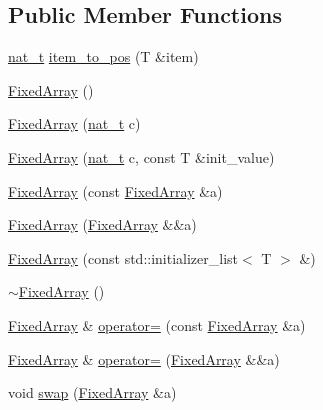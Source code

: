 \subsection*{Public Member Functions}
\begin{DoxyCompactItemize}
\item 
\hyperlink{namespace_designar_aa72662848b9f4815e7bf31a7cf3e33d1}{nat\+\_\+t} \hyperlink{class_designar_1_1_fixed_array_af1c7e826a704015eab8f3accac7ead7d}{item\+\_\+to\+\_\+pos} (T \&item)
\item 
\hyperlink{class_designar_1_1_fixed_array_a493a48e7c23b6b882a96c5451d10248a}{Fixed\+Array} ()
\item 
\hyperlink{class_designar_1_1_fixed_array_ac3bed73485d717ddc1fc412d3e7fea58}{Fixed\+Array} (\hyperlink{namespace_designar_aa72662848b9f4815e7bf31a7cf3e33d1}{nat\+\_\+t} c)
\item 
\hyperlink{class_designar_1_1_fixed_array_a8d313d1c5d828b9a635cb7626e9a6cb2}{Fixed\+Array} (\hyperlink{namespace_designar_aa72662848b9f4815e7bf31a7cf3e33d1}{nat\+\_\+t} c, const T \&init\+\_\+value)
\item 
\hyperlink{class_designar_1_1_fixed_array_a0375e6a3b0eaabd87a044354866c557f}{Fixed\+Array} (const \hyperlink{class_designar_1_1_fixed_array}{Fixed\+Array} \&a)
\item 
\hyperlink{class_designar_1_1_fixed_array_ababc68b389c05fb8c819e5a77afeb626}{Fixed\+Array} (\hyperlink{class_designar_1_1_fixed_array}{Fixed\+Array} \&\&a)
\item 
\hyperlink{class_designar_1_1_fixed_array_aaf63fe5101e36f6f058d71eb7bcfcfcc}{Fixed\+Array} (const std\+::initializer\+\_\+list$<$ T $>$ \&)
\item 
\hyperlink{class_designar_1_1_fixed_array_adfe330be4cd4afd6a097cf5abd2cec38}{$\sim$\+Fixed\+Array} ()
\item 
\hyperlink{class_designar_1_1_fixed_array}{Fixed\+Array} \& \hyperlink{class_designar_1_1_fixed_array_ac7e23eebfa59ba27db48ebd401ea0c53}{operator=} (const \hyperlink{class_designar_1_1_fixed_array}{Fixed\+Array} \&a)
\item 
\hyperlink{class_designar_1_1_fixed_array}{Fixed\+Array} \& \hyperlink{class_designar_1_1_fixed_array_a5a358228f610390c3987883c09cf31f0}{operator=} (\hyperlink{class_designar_1_1_fixed_array}{Fixed\+Array} \&\&a)
\item 
void \hyperlink{class_designar_1_1_fixed_array_ab13ae0d1146e753d3e1128e1cce07d91}{swap} (\hyperlink{class_designar_1_1_fixed_array}{Fixed\+Array} \&a)
\item 

\end{DoxyCompactItemize}
